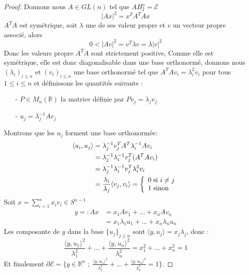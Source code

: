 \documentclass[12pt]{article}
\theoremstyle{definition}
\begin{document}
\begin{proof}
	Donnons nous $A\in GL(n)$ tel que $AB_2^n=\mathcal{E}$
	\begin{equation*}
	|Ax|^2 = x^T A^TAx 
	\end{equation*}
	$A^T A$ est symétrique, soit $\lambda$ une de ses valeur propre et $v$ un vecteur propre associé, alors  
	\begin{equation*}
	0< |Av|^2 = v^T \lambda v = \lambda |v|^2
	\end{equation*}
	Donc les valeurs propre $A^TA$ sont strictement positive, Comme elle est symétrique, elle est donc diagonalisable dans une base orthonormé, donnons nous $(\lambda_i)_{i\leq n}$ et $(v_i)_{i\leq n}$ une base orthonormé tel que $A^TAv_i = \lambda_i^2 v_i$ pour tous $1\leq i\leq n$ et définissons les quantités suivante :
	\begin{enumerate}
		\item[-] $P\in M_n(\mathbb{R})$ la matrice définie par $Pv_j = \lambda_j v_j$
		\item[-] $u_j=\lambda_j^{-1}Av_j$
	\end{enumerate}
	Montrons que les $u_j$ forment une base orthonormée: 
	\begin{align*}
	\langle u_i,u_j\rangle &= \lambda_j^{-1}v_j^TA^T \lambda_i^{-1}Av_i\\
	&=\lambda_j^{-1}\lambda_i^{-1}v_j^T(A^T Av_i) \\
	&= \lambda_j^{-1}\lambda_i^{-1}v_j^T \lambda_i^2 v_i\\
	&=\frac{\lambda_i}{\lambda_j} \langle v_j,v_i\rangle = \left\{ \begin{array}{ll} 0 \hspace{1mm}\text{si $i\neq j$} \\ 1 \hspace{1mm}\text{sinon} \end{array} \right.
	\end{align*}
	Soit $x = \sum_{i=1}^{n}x_i v_i\in S^{n-1}$  
	\begin{align*}
	y=: Ax&= x_1Av_1+...+x_nAv_n \\ 
	&= x_1 \lambda_1 u_1 + ... + x_n \lambda_n u_n
	\end{align*}
	Les composante de $y$ dans la base $\{u_j\}_{j\leq n}$ sont $\langle y,u_j\rangle = x_j\lambda_j$, donc :
	\begin{equation*}
	\frac{\langle y,u_1\rangle ^2}{\lambda_1^2}+...+\frac{\langle y,u_n\rangle ^2}{\lambda_n^2} = x_1^2+...+x_n^2 =1
	\end{equation*}
	Et finalement $\partial \mathcal{E} = \big\{y\in\mathbb{R}^n \; ; \; \frac{\langle y,u_1\rangle ^2}{\lambda_1^2}+...+\frac{\langle y,u_n\rangle ^2}{\lambda_n^2} = 1\big\} $.
\end{proof}
\end{document}
